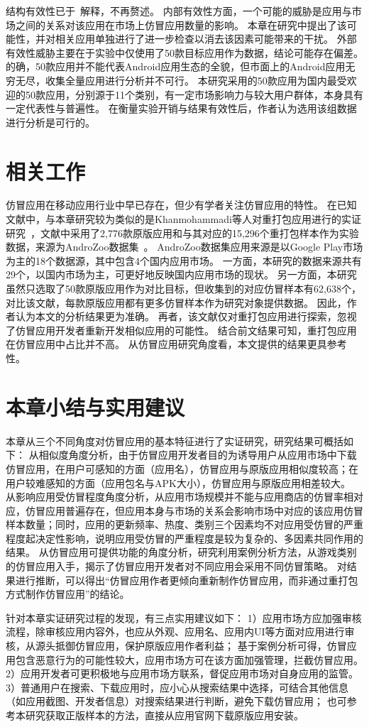 结构有效性已于~解释，不再赘述。
内部有效性方面，一个可能的威胁是应用与市场之间的关系对该应用在市场上仿冒应用数量的影响。
本章在研究中提出了该可能性，并对相关应用单独进行了进一步检查以消去该因素可能带来的干扰。
外部有效性威胁主要在于实验中仅使用了50款目标应用作为数据，结论可能存在偏差。
的确，50款应用并不能代表Android应用生态的全貌，但市面上的Android应用无穷无尽，收集全量应用进行分析并不可行。
本研究采用的50款应用为国内最受欢迎的50款应用，分别源于11个类别，有一定市场影响力与较大用户群体，本身具有一定代表性与普遍性。
在衡量实验开销与结果有效性后，作者认为选用该组数据进行分析是可行的。

\section{相关工作}

仿冒应用在移动应用行业中早已存在，但少有学者关注仿冒应用的特性。
在已知文献中，与本章研究较为类似的是Khanmohammadi等人对重打包应用进行的实证研究~\cite{khanmohammadi2019empirical}，文献中采用了2,776款原版应用和与其对应的15,296个重打包样本作为实验数据，来源为AndroZoo数据集~\cite{li2017androzoo++}。
AndroZoo数据集应用来源是以Google Play市场为主的18个数据源，其中包含4个国内应用市场。
一方面，本研究的数据来源共有29个，以国内市场为主，可更好地反映国内应用市场的现状。
另一方面，本研究虽然只选取了50款原版应用作为对比目标，但收集到的对应仿冒样本有62,638个，对比该文献，每款原版应用都有更多仿冒样本作为研究对象提供数据。
因此，作者认为本文的分析结果更为准确。
再者，该文献仅对重打包应用进行探索，忽视了仿冒应用开发者重新开发相似应用的可能性。
结合前文结果可知，重打包应用在仿冒应用中占比并不高。
从仿冒应用研究角度看，本文提供的结果更具参考性。


\section{本章小结与实用建议}

本章从三个不同角度对仿冒应用的基本特征进行了实证研究，研究结果可概括如下：
从相似度角度分析，由于仿冒应用开发者目的为诱导用户从应用市场中下载仿冒应用，在用户可感知的方面（应用名），仿冒应用与原版应用相似度较高；在用户较难感知的方面（应用包名与APK大小），仿冒应用与原版应用相差较大。
从影响应用受仿冒程度角度分析，从应用市场规模并不能与应用商店的仿冒率相对应，仿冒应用普遍存在，但应用本身与市场的关系会影响市场中对应的该应用仿冒样本数量；同时，应用的更新频率、热度、类别三个因素均不对应用受仿冒的严重程度起决定性影响，说明应用受仿冒的严重程度是较为复杂的、多因素共同作用的结果。
从仿冒应用可提供功能的角度分析，研究利用案例分析方法，从游戏类别的仿冒应用入手，揭示了仿冒应用开发者对不同应用会采用不同仿冒策略。
对结果进行推断，可以得出``仿冒应用作者更倾向重新制作仿冒应用，而非通过重打包方式制作仿冒应用''的结论。

针对本章实证研究过程的发现，有三点实用建议如下：
1）应用市场方应加强审核流程，除审核应用内容外，也应从外观、应用名、应用内UI等方面对应用进行审核，从源头抵御仿冒应用，保护原版应用作者利益；
基于案例分析可得，仿冒应用包含恶意行为的可能性较大，应用市场方可在该方面加强管理，拦截仿冒应用。
2）应用开发者可更积极地与应用市场方联系，督促应用市场对自身应用的监管。
3）普通用户在搜索、下载应用时，应小心从搜索结果中选择，可结合其他信息（如应用截图、开发者信息）对搜索结果进行判断，避免下载仿冒应用；
也可参考本研究获取正版样本的方法，直接从应用官网下载原版应用安装。
